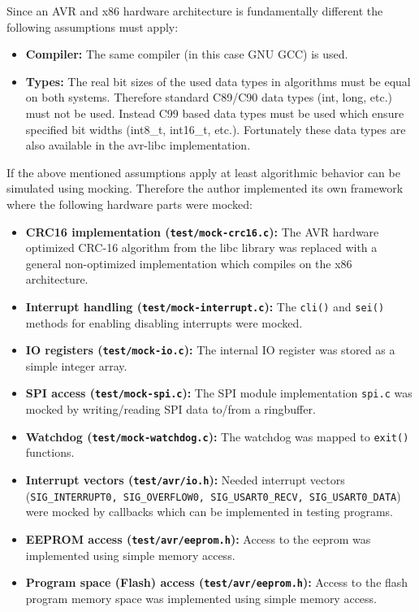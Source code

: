 Since an AVR and x86 hardware architecture is fundamentally different the following assumptions must apply:

\begin{itemize}
    \item \textbf{Compiler:} The same compiler (in this case GNU GCC) is used.
    \item \textbf{Types:} The real bit sizes of the used data types in algorithms must be equal on both systems. Therefore standard C89/C90 data types (int, long, etc.) must not be used. Instead C99 based data types must be used which ensure specified bit widths (int8\_t, int16\_t, etc.). Fortunately these data types are also available in the avr-libc implementation.
\end{itemize}

If the above mentioned assumptions apply at least algorithmic behavior can be simulated using mocking. Therefore the author implemented its own framework where the following hardware parts were mocked:

\begin{itemize}
    \item \textbf{CRC16 implementation (\texttt{test/mock-crc16.c}):} The AVR hardware optimized CRC-16 algorithm from the libc library was replaced with a general non-optimized implementation which compiles on the x86 architecture.
    \item \textbf{Interrupt handling (\texttt{test/mock-interrupt.c}):} The \texttt{cli()} and \texttt{sei()} methods for enabling disabling interrupts were mocked.
    \item \textbf{IO registers (\texttt{test/mock-io.c}):} The internal IO register was stored as a simple integer array.
    \item \textbf{SPI access (\texttt{test/mock-spi.c}):} The SPI module implementation \texttt{spi.c} was mocked by writing/reading SPI data to/from a ringbuffer.
    \item \textbf{Watchdog (\texttt{test/mock-watchdog.c}):} The watchdog was mapped to \texttt{exit()} functions.
    \item \textbf{Interrupt vectors (\texttt{test/avr/io.h}):} Needed interrupt vectors (\texttt{SIG\_INTERRUPT0, SIG\_OVERFLOW0, SIG\_USART0\_RECV, SIG\_USART0\_DATA}) were mocked by callbacks which can be implemented in testing programs.
    \item \textbf{EEPROM access (\texttt{test/avr/eeprom.h}):} Access to the eeprom was implemented using simple memory access.
    \item \textbf{Program space (Flash) access (\texttt{test/avr/eeprom.h}):} Access to the flash program memory space was implemented using simple memory access.
\end{itemize}

